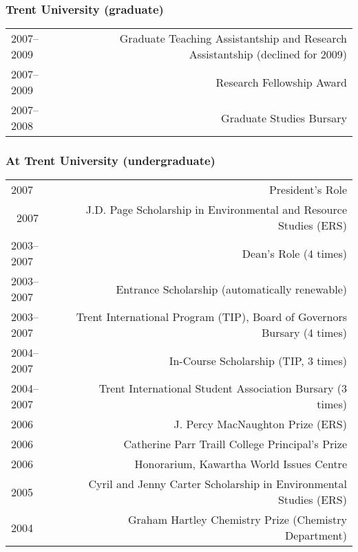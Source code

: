 \subsubsection*{Trent University (graduate)}
\begin{tabular}{L!{\VRule}R}    
2007--2009 & Graduate Teaching Assistantship and Research Assistantship (declined for 2009) \\
2007--2009 & Research Fellowship Award \\
2007--2008 & Graduate Studies Bursary \\
\end{tabular}

\subsubsection*{At Trent University (undergraduate)}
\begin{tabular}{L!{\VRule}R}    
2007 & President's Role  \\\
2007 & J.D. Page Scholarship in Environmental and Resource Studies (ERS) \\ 
2003--2007 & Dean's Role (4 times) \\
2003--2007 & Entrance Scholarship (automatically renewable) \\
2003--2007 & Trent International Program (TIP), Board of Governors Bursary (4 times) \\
2004--2007 & In-Course Scholarship (TIP, 3 times) \\
2004--2007 & Trent International Student Association Bursary (3 times) \\
2006 & J. Percy MacNaughton Prize (ERS) \\
2006 & Catherine Parr Traill College Principal's Prize \\
2006 & Honorarium, Kawartha World Issues Centre \\
2005 & Cyril and Jenny Carter Scholarship in Environmental Studies (ERS) \\
2004 & Graham Hartley Chemistry Prize (Chemistry Department) \\
\end{tabular}
